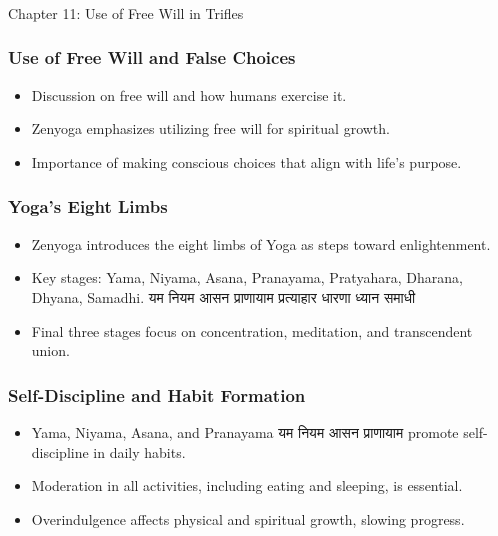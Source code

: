 \begin{frame}[fragile]\frametitle{}
\begin{center}
{\Large Chapter 11: Use of Free Will in Trifles }
\end{center}
\end{frame}

\begin{frame}[fragile]\frametitle{Use of Free Will and False Choices}
    \begin{itemize}
        \item Discussion on free will and how humans exercise it.
        \item Zenyoga emphasizes utilizing free will for spiritual growth.
        \item Importance of making conscious choices that align with life's purpose.
    \end{itemize}
\end{frame}

\begin{frame}[fragile]\frametitle{Yoga's Eight Limbs}
    \begin{itemize}
        \item Zenyoga introduces the eight limbs of Yoga as steps toward enlightenment.
        \item Key stages: Yama, Niyama, Asana, Pranayama, Pratyahara, Dharana, Dhyana, Samadhi. यम नियम आसन प्राणायाम प्रत्याहार धारणा ध्यान समाधी 
        \item Final three stages focus on concentration, meditation, and transcendent union.
    \end{itemize}
\end{frame}

\begin{frame}[fragile]\frametitle{Self-Discipline and Habit Formation}
    \begin{itemize}
        \item Yama, Niyama, Asana, and Pranayama यम नियम आसन प्राणायाम promote self-discipline in daily habits.
        \item Moderation in all activities, including eating and sleeping, is essential.
        \item Overindulgence affects physical and spiritual growth, slowing progress.
    \end{itemize}
\end{frame}

